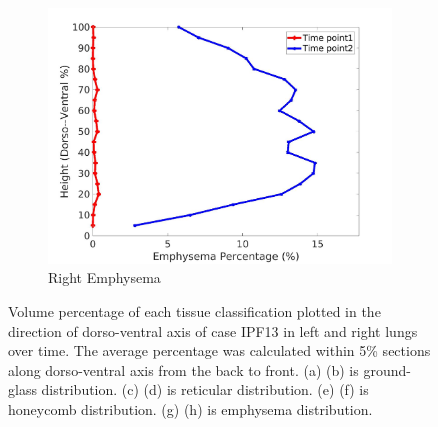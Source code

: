 \begin{figure}[H]
\begin{subfigure}{.42\linewidth}
  \includegraphics[width=\linewidth,trim={{.0\wd0} {.0\wd0} {.0\wd0} {.0\wd0}},clip]{Appendix/Image_AppexA/DorsoToVentral/IPF13RightLungEmphysemaDiseaseDorsoToVentral.jpg}
  \caption{Right Emphysema}
  \label{fig:IPF13DiseaseDorsoToVentral-h}
\end{subfigure}
\caption{Volume percentage of each tissue classification plotted in the direction of dorso-ventral axis of case IPF13 in left and right lungs over time. The average percentage was calculated within 5\% sections along dorso-ventral axis from the back to front. (a) (b) is ground-glass distribution. (c) (d) is reticular distribution. (e) (f) is honeycomb distribution. (g) (h) is emphysema distribution.}
\label{fig:IPF13DiseaseDorsoToVentral}
\end{figure}

